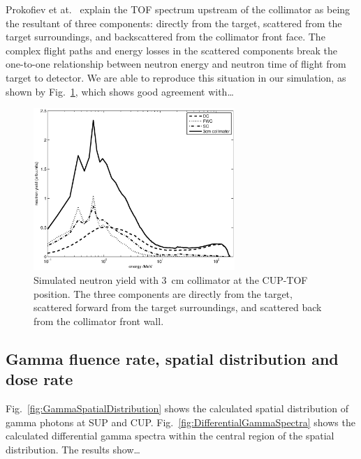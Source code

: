 \documentclass[11pt,a4paper]{IEEEtran}
\let\MYoriglatexcaption\caption
\renewcommand{\caption}[2][\relax]{\MYoriglatexcaption[#2]{#2}}
\begin{document}
Prokofiev et at.~\cite{Prokofiev14} explain the TOF spectrum upstream of the collimator as being the resultant of three components: directly from the target, scattered from the target surroundings, and backscattered from the collimator front face.
The complex flight paths and energy losses in the scattered components break the one-to-one relationship between neutron energy and neutron time of flight from target to detector.
We are able to reproduce this situation in our simulation, as shown by Fig.~\ref{fig:TOF3Componentslinear}, which shows good agreement with\ldots{}

\begin{figure}[!t]
	\centering
	\includegraphics[width=3in]{TOF3Componentslinear.eps}
	\caption{
    Simulated neutron yield with \SI{3}{\cm} collimator at the CUP-TOF position.
    The three components are directly from the target, scattered forward from the target surroundings, and scattered back from the collimator front wall.}
	\label{fig:TOF3Componentslinear}
\end{figure}

\subsection{Gamma fluence rate, spatial distribution and dose rate}

Fig.~\ref{fig:GammaSpatialDistribution} shows the calculated spatial distribution of gamma photons at SUP and CUP.
Fig.~\ref{fig:DifferentialGammaSpectra} shows the calculated differential gamma spectra within the central region of the spatial distribution.
The results show\ldots{}
\end{document}
